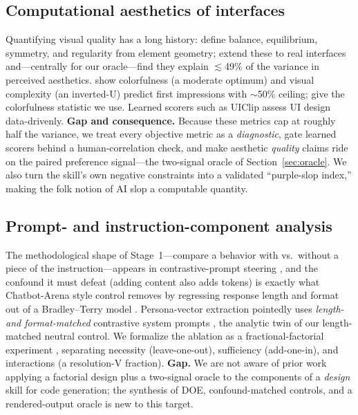\subsection{Computational aesthetics of interfaces}
Quantifying visual quality has a long history: \citet{ngo2003modelling} define balance,
equilibrium, symmetry, and regularity from element geometry; \citet{miniukovich2015computation}
extend these to real interfaces and---centrally for our oracle---find they explain
$\lesssim$49\% of the variance in perceived aesthetics. \citet{reinecke2013predicting} show
colorfulness (a moderate optimum) and visual complexity (an inverted-U) predict first
impressions with $\sim$50\% ceiling; \citet{hasler2003colorfulness} give the colorfulness
statistic we use. Learned scorers such as UIClip \citep{wu2024uiclip} assess UI design
data-drivenly. \textbf{Gap and consequence.} Because these metrics cap at roughly half the
variance, we treat every objective metric as a \emph{diagnostic}, gate learned scorers behind a
human-correlation check, and make aesthetic \emph{quality} claims ride on the paired preference
signal---the two-signal oracle of Section~\ref{sec:oracle}. We also turn the skill's own
negative constraints into a validated ``purple-slop index,'' making the folk notion of AI slop
a computable quantity.

\subsection{Prompt- and instruction-component analysis}
The methodological shape of Stage~1---compare a behavior with vs.\ without a piece of the
instruction---appears in contrastive-prompt steering \citep{rimsky2024caa,chen2025persona}, and
the confound it must defeat (adding content also adds tokens) is exactly what Chatbot-Arena
style control removes by regressing response length and format out of a Bradley--Terry model
\citep{chiang2024stylecontrol}. Persona-vector extraction pointedly uses \emph{length- and
format-matched} contrastive system prompts \citep{chen2025persona}, the analytic twin of our
length-matched neutral control. We formalize the ablation as a fractional-factorial experiment
\citep{montgomery2017doe}, separating necessity (leave-one-out), sufficiency (add-one-in), and
interactions (a resolution-V fraction). \textbf{Gap.} We are not aware of prior work applying a
factorial design plus a two-signal oracle to the components of a \emph{design} skill for code
generation; the synthesis of DOE, confound-matched controls, and a rendered-output oracle is
new to this target.

